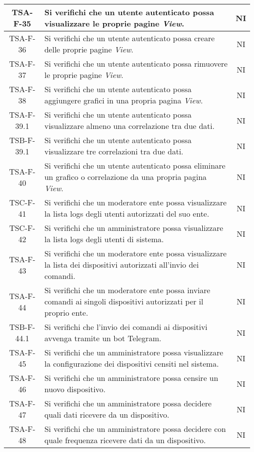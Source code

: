\begin{center}
\begin{longtable}{|c|p{10cm}|c|}
			 \hline
			 TSA-F-35 & Si verifichi che un utente autenticato possa visualizzare le proprie pagine \textit{View}. & NI \\
			 \hline
			 TSA-F-36 & Si verifichi che un utente autenticato possa creare delle proprie pagine \textit{View}. & NI \\
			 \hline
			 TSA-F-37 & Si verifichi che un utente autenticato possa rimuovere le proprie pagine \textit{View}. & NI \\
			 \hline
			 TSA-F-38 & Si verifichi che un utente autenticato possa aggiungere grafici in una propria pagina  \textit{View}. & NI \\
			 \hline
			 TSA-F-39.1 & Si verifichi che un utente autenticato possa visualizzare almeno una correlazione tra due dati. & NI \\
			 \hline
			 TSB-F-39.1 & Si verifichi che un utente autenticato possa visualizzare tre correlazioni tra due dati. & NI \\
			 \hline
			 TSA-F-40 & Si verifichi che un utente autenticato possa eliminare un grafico o correlazione da una propria pagina \textit{View}. & NI \\
			 \hline
			 TSC-F-41 & Si verifichi che un moderatore ente possa visualizzare la lista logs degli utenti autorizzati del suo ente. & NI \\
			 \hline
			 TSC-F-42 & Si verifichi che un amministratore possa visualizzare la lista logs degli utenti di sistema. & NI \\
			 \hline
			 TSA-F-43 & Si verifichi che un moderatore ente possa visualizzare la lista dei dispositivi autorizzati all'invio dei comandi. & NI \\
			 \hline
			 TSA-F-44 & Si verifichi che un moderatore ente possa inviare comandi ai singoli dispositivi autorizzati per il proprio ente. & NI \\
			 \hline
			 TSB-F-44.1 & Si verifichi che l'invio dei comandi ai dispositivi avvenga tramite un bot Telegram. & NI \\
			 \hline
			 TSA-F-45 & Si verifichi che un amministratore possa visualizzare la configurazione dei dispositivi censiti nel sistema. & NI \\
			 \hline
			 TSA-F-46 & Si verifichi che un amministratore possa censire un nuovo dispositivo. & NI \\
			 \hline
			 TSA-F-47 & Si verifichi che un amministratore possa decidere quali dati ricevere da un dispositivo. & NI \\
			 \hline
			 TSA-F-48 & Si verifichi che un amministratore possa decidere con quale frequenza ricevere dati da un dispositivo. & NI \\

\end{longtable}
\end{center}
